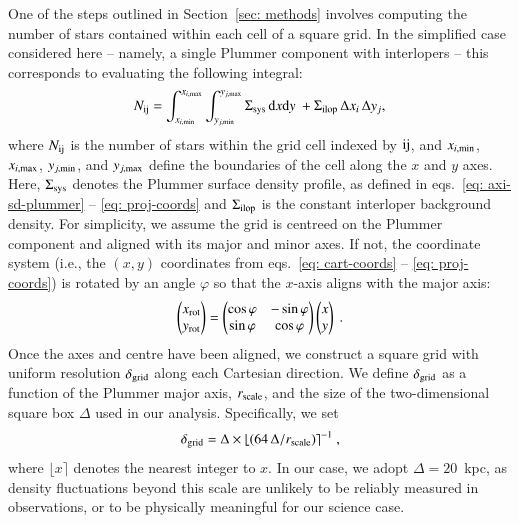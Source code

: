 \documentclass[fleqn,usenatbib]{mnras}
\newcommand{\diff}{{\rm d}}
\newcommand{\round}[1]{\ensuremath{\lfloor#1\rceil}}
\begin{document}
One of the steps outlined in Section~\ref{sec: methods} involves computing the number of stars contained within each cell of a square grid. In the simplified case considered here -- namely, a single Plummer component with interlopers -- this corresponds to evaluating the following integral:
\begin{equation} \label{eq: cell-count}
    N_{\rm ij} = \int_{x_{i, \rm min}}^{x_{i, \rm max}} \int_{y_{j, \rm min}}^{y_{j, \rm max}} \Sigma_{\rm sys} \, \diff x \diff y  \   +  \Sigma_{\rm ilop} \, \Delta x_{i} \, \Delta y_{j},
\end{equation}
%
where $N_{\rm ij}$ is the number of stars within the grid cell indexed by $\rm ij$, and $x_{i, \rm min}$, $x_{i, \rm max}$, $y_{j, \rm min}$, and $y_{j, \rm max}$ define the boundaries of the cell along the $x$ and $y$ axes. Here, $\Sigma_{\rm sys}$ denotes the Plummer surface density profile, as defined in eqs.~\ref{eq: axi-sd-plummer} -- \ref{eq: proj-coords} and $\Sigma_{\rm ilop}$ is the constant interloper background density.
For simplicity, we assume the grid is centreed on the Plummer component and aligned with its major and minor axes.
If not, the coordinate system (i.e., the $(x, y)$ coordinates from eqs.~\ref{eq: cart-coords} -- \ref{eq: proj-coords}) is rotated by an angle $\varphi$ so that the $x$-axis aligns with the major axis:
\begin{equation}
    \begin{pmatrix}
        x_{\rm rot} \\
        y_{\rm rot} \\
    \end{pmatrix} = 
    \begin{pmatrix}
        \cos\varphi & -\sin\varphi \\
        \sin\varphi & \cos\varphi \\
    \end{pmatrix}
    \begin{pmatrix}
        x \\
        y \\
    \end{pmatrix} \ .
\end{equation}
%
Once the axes and centre have been aligned, we construct a square grid with uniform resolution $\delta_{\rm grid}$ along each Cartesian direction. We define $\delta_{\rm grid}$ as a function of the Plummer major axis, $r_{\rm scale}$, and the size of the two-dimensional square box $\Delta$ used in our analysis. Specifically, we set
\begin{equation}
\delta_{\rm grid} = \Delta \times \round{(64 \, \Delta / r_{\rm scale})}^{-1} \ ,
\end{equation}
where $\round{x}$ denotes the nearest integer to $x$. In our case, we adopt $\Delta = 20$~kpc, as density fluctuations beyond this scale are unlikely to be reliably measured in observations, or to be physically meaningful for our science case.
\end{document}
